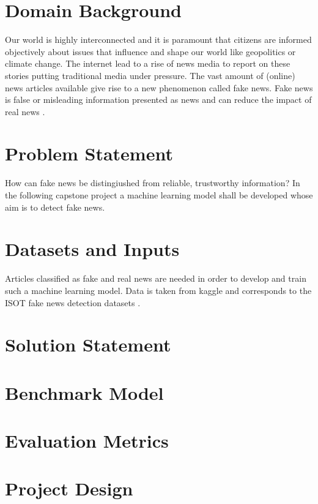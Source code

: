 \documentclass[a4paper]{article}
\begin{document}
\section{Domain Background}

Our world is highly interconnected and it is paramount that citizens are informed objectively about issues that influence and shape our world like geopolitics or climate change. The internet lead to a rise of news media to report on these stories putting traditional media under pressure. The vast amount of (online) news articles available give rise to a new phenomenon called fake news. Fake news is false or misleading information presented as news and can reduce the impact of real news \cite{bib:fakenews}.

\section{Problem Statement}

How can fake news be distingiushed from reliable, trustworthy information? In the following capstone project a machine learning model shall be developed whose aim is to detect fake news.

\section{Datasets and Inputs}

Articles classified as fake and real news are needed in order to develop and train such a machine learning model. Data is taken from kaggle \cite{bib:kaggle} and corresponds to the ISOT fake news detection datasets \cite{bib:isot}. 


\section{Solution Statement}

\section{Benchmark Model}

\section{Evaluation Metrics}

\section{Project Design}
\end{document}

